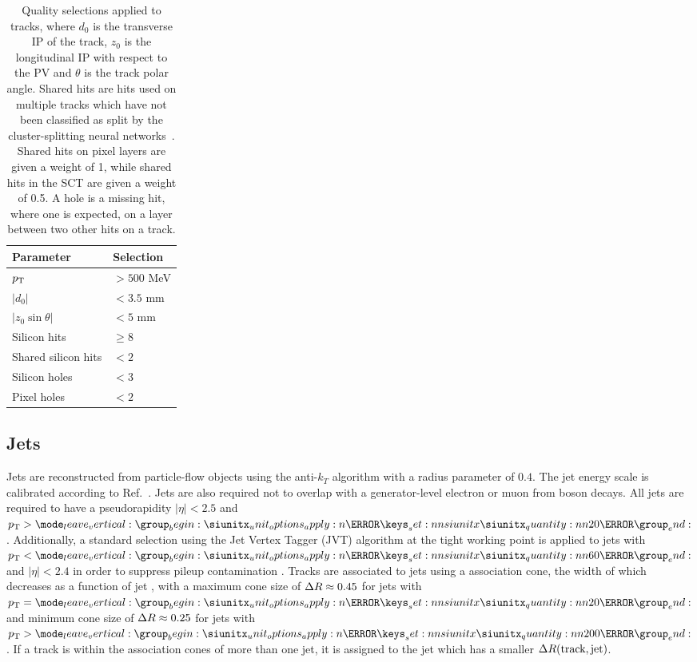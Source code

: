 \begin{table}[!htbp]
  \footnotesize\centering
  \setlength{\tabcolsep}{0.5em} %
  \caption{
    Quality selections applied to tracks,
    where $d_0$ is the transverse IP of the track, $z_0$ is the longitudinal IP with respect to the PV and $\theta$ is the track polar angle.
    Shared hits are hits used on multiple tracks which have not been classified as split by the cluster-splitting neural networks~\cite{PERF-2015-08}.
    Shared hits on pixel layers are given a weight of 1, while shared hits in the SCT are given a weight of 0.5.
    A hole is a missing hit, where one is expected, on a layer between two other hits on a track.
    }
  \begin{tabular}{ll}
    \toprule 
    \textbf{Parameter} & \textbf{Selection} \\
    \hline
    $p_{\text{T}}$                & $> 500$ MeV \\
    $|d_0|$              & $< 3.5$ mm \\
    $|z_0 \sin\theta|$   & $< 5$ mm \\
    Silicon hits         & $\ge 8$ \\
    Shared silicon hits  & $< 2$ \\
    Silicon holes        & $< 3$ \\
    Pixel holes          & $< 2$ \\
    \bottomrule
  \end{tabular}
  \vspace{4mm}
  \label{tab:track_selections}
\end{table}


\subsection{Jets}\label{sec:jets}

Jets are reconstructed from particle-flow objects \cite{PERF-2015-09} using the anti-$k_T$ algorithm \cite{Cacciari:2008gp} with a radius parameter of $0.4$.
The jet energy scale is calibrated according to Ref.~\cite{PERF-2016-04}.
Jets are also required not to overlap with a generator-level electron or muon from \Wboson boson decays.
All jets are required to have a pseudorapidity $|\eta| < 2.5$ and $\pt > \SI{20}{\GeV}$. 
Additionally, a standard selection using the Jet Vertex Tagger (JVT) algorithm at the tight working point is applied to jets with $\pt < \SI{60}{\GeV}$ and $|\eta| < 2.4$ in order to suppress pileup contamination \cite{ATLAS-CONF-2014-018}.
Tracks are associated to jets using a \DeltaR association cone, the width of which decreases as a function of jet \pt, with a maximum cone size of $\Delta R \approx 0.45$ for jets with $\pt = \SI{20}{\GeV}$ and minimum cone size of $\Delta R \approx 0.25$ for jets with $\pt > \SI{200}{\GeV}$. 
If a track is within the association cones of more than one jet, it is assigned to the jet which has a smaller $\Delta R(\text{track}, \text{jet})$.

